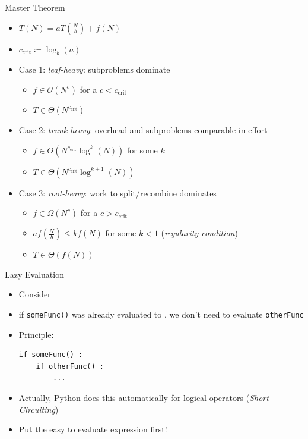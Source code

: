 \begin{frame}{Master Theorem}
%
\begin{itemize}
\item $T(N) = a T(\frac{N}{b}) + f(N)$
\item $c_{\text{crit}} \coloneqq \log_b(a)$
\item Case 1: \emph{leaf-heavy}: subproblems dominate
	\begin{itemize}
	\item $f \in \mathcal{O}(N^c)$ for a $c < c_{\text{crit}}$
	\item[\Thus] $T \in \Theta(N^{c_{\text{crit}}})$
	\end{itemize}
\item Case 2: \emph{trunk-heavy}: overhead and subproblems comparable in effort
	\begin{itemize}
	\item $f \in \Theta(N^{c_{\text{crit}}} \log^k(N))$ for some $k$
	\item[\Thus] $T \in \Theta(N^{c_{\text{crit}}} \log^{k+1}(N) )$
	\end{itemize}
\item Case 3: \emph{root-heavy}: work to split/recombine dominates
	\begin{itemize}
	\item $f \in \Omega(N^c)$ for a $c > c_{\text{crit}}$
	\item $af(\frac{N}{b}) \leq kf(N)$ for some $k < 1$ (\emph{regularity condition})
	\item[\Thus] $T \in \Theta(f(N))$
	\end{itemize}
\end{itemize}
%
\end{frame}


\begin{frame}[fragile]{Lazy Evaluation}
%
\begin{itemize}
\item Consider 
\item if \texttt{someFunc()} was already evaluated to , we don't need to evaluate \texttt{otherFunc}
\item Principle:
	\begin{verbatim}
if someFunc() :
    if otherFunc() :
        ...
	\end{verbatim}
\item Actually, Python does this automatically for logical operators (\thus \emph{Short Circuiting})
\item[\Thus] Put the easy to evaluate expression first!
\end{itemize}
%
\end{frame}

